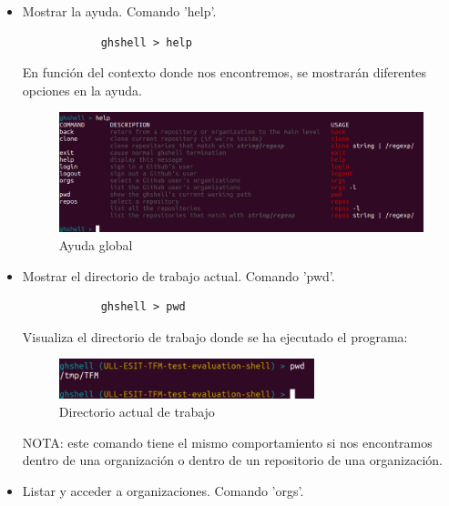 	\begin{itemize}
		\item Mostrar la ayuda. Comando 'help'.
		
		\begin{verbatim}
			ghshell > help
		\end{verbatim}
		
		En función del contexto donde nos encontremos, se mostrarán diferentes opciones en la ayuda.
		
		\begin{figure}[H]
		\begin{center}
		\includegraphics[width=1\textwidth]{images/help1-1}
		\caption{Ayuda global}
		\label{fig:help1-1}
		\end{center}
		\end{figure}
		
		\item Mostrar el directorio de trabajo actual. Comando 'pwd'.
		
		\begin{verbatim}
			ghshell > pwd
		\end{verbatim}
		
		Visualiza el directorio de trabajo donde se ha ejecutado el programa:
		
		\begin{figure}[H]
		\begin{center}
		\includegraphics[width=0.7\textwidth]{images/pwd}
		\caption{Directorio actual de trabajo}
		\label{fig:pwd}
		\end{center}
		\end{figure}
		
		NOTA: este comando tiene el mismo comportamiento si nos encontramos dentro de una organización o dentro de un repositorio de una organización.
		
		\item  Listar y acceder a organizaciones. Comando 'orgs'.
		

\end{itemize}
